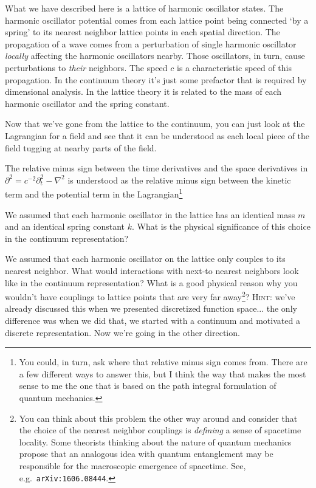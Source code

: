 What we have described here is a lattice of harmonic oscillator states. The harmonic oscillator potential comes from each lattice point being connected `by a spring' to its nearest neighbor lattice points in each spatial direction. The propagation of a wave comes from a perturbation of single harmonic oscillator \emph{locally} affecting the harmonic oscillators nearby. Those oscillators, in turn, cause perturbations to \emph{their} neighbors. The speed $c$ is a characteristic speed of this propagation. In the continuum theory it's just some prefactor that is required by dimensional analysis. In the lattice theory it is related to the mass of each harmonic oscillator and the spring constant. 

Now that we've gone from the lattice to the continuum, you can just look at the Lagrangian for a field and see that it can be understood as each local piece of the field tugging at nearby parts of the field. 

\begin{example}
The relative minus sign between the time derivatives and the space derivatives in $\partial^2 = c^{-2}\partial_t^2 - \nabla^2$ is understood as the relative minus sign between the kinetic term and the potential term in the Lagrangian\footnote{You could, in turn, ask where that relative minus sign comes from. There are a few different ways to answer this, but I think the way that makes the most sense to me the one that is based on the path integral formulation of quantum mechanics.} 
\end{example}

\begin{exercise}
We assumed that each harmonic oscillator in the lattice has an identical mass $m$ and an identical spring constant $k$. What is the physical significance of this choice in the continuum representation?
\end{exercise}

\begin{exercise}
We assumed that each harmonic oscillator on the lattice only couples to its nearest neighbor. What would interactions with next-to nearest neighbors look like in the continuum representation? What is a good physical reason why you wouldn't have couplings to lattice points that are very far away\footnote{You can think about this problem the other way around and consider that the choice of the nearest neighbor couplings is \emph{defining} a sense of spacetime locality. Some theorists thinking about the nature of quantum mechanics propose that an analogous idea with quantum entanglement may be responsible for the macroscopic emergence of spacetime. See, e.g.~\texttt{arXiv:1606.08444}.}? \textsc{Hint}: we've already discussed this when we presented discretized function space... the only difference was when we did that, we started with a continuum and motivated a discrete representation. Now we're going in the other direction.
\end{exercise}



